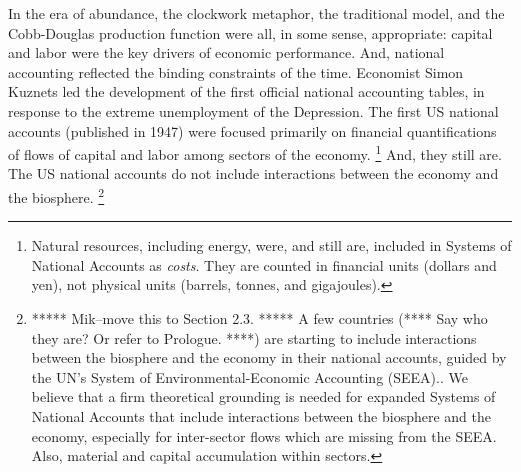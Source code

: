 In the era of abundance, 
the clockwork metaphor, 
the traditional model, 
and the Cobb-Douglas production function 
were all, in some sense, appropriate: 
capital and labor were the key drivers of economic performance.
And, national accounting reflected the binding constraints of the time. 
Economist Simon Kuznets led the development
of the first official national accounting tables,
in response to the extreme unemployment of the Depression. 
The first US national accounts (published in 1947) 
were focused primarily on financial quantifications 
of flows of capital and labor
among sectors of the economy.%
	\footnote{
	Natural resources, including energy, were, and still are, 
	included in Systems of National Accounts as \emph{costs}.
	They are counted in financial units
	(dollars and yen), 
	not physical units
	(barrels, tonnes, and gigajoules).
	}
And, they still are. 
The US national accounts do not include 
interactions between the economy and the biosphere.%
	\footnote{
	***** Mik--move this to Section 2.3. *****
	A few countries (**** Say who they are? Or refer to Prologue. ****) 
	are starting to include interactions 
	between the biosphere and the economy in their national accounts,
	guided by the UN's System of Environmental-Economic Accounting 
	(SEEA).\cite[p. 1]{UNSEEA2014}.
	We believe that a firm theoretical grounding
	is needed for expanded Systems of National Accounts
	that include interactions between the biosphere and the economy,
	especially for inter-sector flows which are missing from the SEEA.
	Also, material and capital accumulation within sectors.
	}


